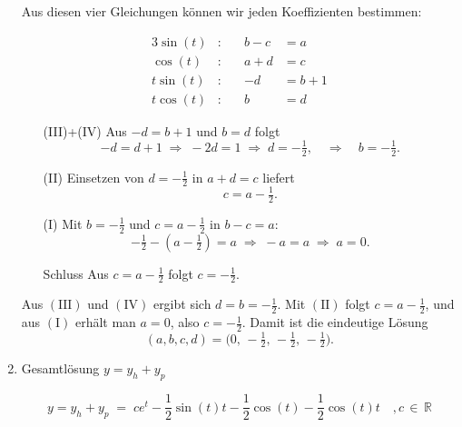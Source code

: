 \documentclass[a4paper,11pt,oneside,open=any,parskip=half, DIV=15]{scrreprt}
\begin{document}
\begin{enumerate}
            Aus diesen vier Gleichungen können wir jeden Koeffizienten bestimmen:

            \begin{alignat*}{3}
               \sin(t) &: \quad & b - c &= a \tag{I}\\
               \cos(t) &: \quad & a + d &= c \tag{II}\\
               t\sin(t) &: \quad & -d &= b + 1 \tag{III}\\
               t\cos(t) &: \quad & b &= d \tag{IV}
            \end{alignat*}


            \begin{enumerate}
               \item[(III)+(IV)] Aus \( -d=b+1 \) und \( b=d \) folgt
               \[
                  -d=d+1 \;\Rightarrow\; -2d=1 \;\Rightarrow\; d=-\tfrac12,
                  \quad\Rightarrow\quad b=-\tfrac12.
               \]
               \item[(II)] Einsetzen von \( d=-\tfrac12 \) in \( a+d=c \) liefert
               \[
                  c=a-\tfrac12.
               \]
               \item[(I)] Mit \( b=-\tfrac12 \) und \( c=a-\tfrac12 \) in \( b-c=a \):
               \[
                  -\tfrac12-(a-\tfrac12)=a \;\Rightarrow\; -a=a \;\Rightarrow\; a=0.
               \]
               \item[Schluss] Aus \( c=a-\tfrac12 \) folgt \( c=-\tfrac12 \).
            \end{enumerate}

            Aus \((\mathrm{III})\) und \((\mathrm{IV})\) ergibt sich \( d=b=-\tfrac12 \).
            Mit \((\mathrm{II})\) folgt \( c=a-\tfrac12 \), und aus \((\mathrm{I})\) erhält man \( a=0 \),
            also \( c=-\tfrac12 \). Damit ist die eindeutige Lösung
            \[
               \boxed{(a,b,c,d)=\bigl(0,\,-\tfrac12,\,-\tfrac12,\,-\tfrac12\bigr)}.
            \]


         \item Gesamtlösung \(y = y_h + y_p\)
         
            \[
               y = y_h + y_p \; = \; ce^t - \frac{1}{2}\sin(t)t - \frac{1}{2}\cos(t) - \frac{1}{2}\cos(t)t \quad , c \, \in \, \mathbb{R}
            \]

      \end{enumerate}
\end{document}
